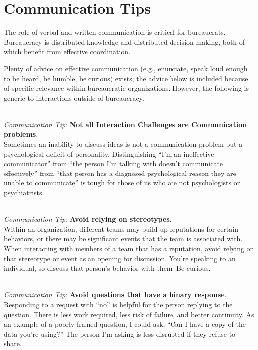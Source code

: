 \section{Communication Tips}

The role of verbal and written communication is critical for bureaucrats. Bureaucracy is distributed knowledge and distributed decision-making, both of which benefit from effective coordination. 


Plenty of advice on effective communication (e.g., enunciate, speak loud enough to be heard, be humble, be curious) exists; the advice below is included because of specific relevance within bureaucratic organizations. 
However, the following is generic to interactions outside of bureaucracy. 


\ \\
\textit{Communication Tip}: \textbf{Not all Interaction Challenges are Communication problems}.\\
Sometimes an inability to discuss ideas is not a communication problem but a psychological deficit of personality. Distinguishing ``I'm an ineffective communicator'' from ``the person I'm talking with doesn't communicate effectively'' from ``that person has a diagnosed psychological reason they are unable to communicate'' is tough for those of us who are not psychologists or psychiatrists. 


\ \\
\textit{Communication Tip}: \textbf{Avoid relying on stereotypes}. \\
Within an organization, different teams may build up reputations for certain behaviors, or there may be significant events that the team is associated with. 
When interacting with members of a team that has a reputation, avoid relying on that stereotype or event as an opening for discussion. 
You're speaking to an individual, so discuss that person's behavior with them. Be curious.

\ \\
\textit{Communication Tip}: \textbf{Avoid questions that have a binary response\label{sec:yes-no-questions}}.\\
Responding to a request with ``no'' is helpful for the person replying to the question. There is less work required, less risk of failure, and better continuity. As an example of a poorly framed question, I could ask, ``Can I have a copy of the data you're using?'' The person I'm asking is less disrupted if they refuse to share. 

